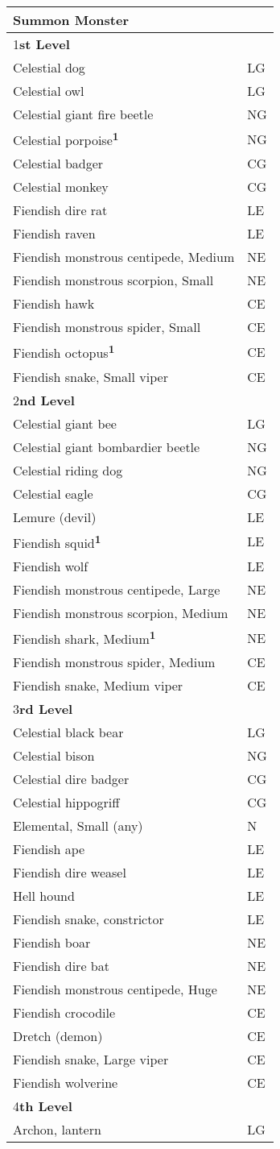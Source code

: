 \documentclass{article}
\begin{document}
\vspace{12pt}
\begin{tabular}{|>{\raggedright}p{227pt}|>{\raggedright}p{21pt}|}
\hline
S\textbf{ummon Monster} & \tabularnewline
\hline
1\textbf{st Level} & \tabularnewline
\hline
Celestial dog & LG\tabularnewline
\hline
Celestial owl & LG\tabularnewline
\hline
Celestial giant fire beetle & NG\tabularnewline
\hline
Celestial porpoise\textsuperscript{\textbf{1}} & NG\tabularnewline
\hline
Celestial badger & CG\tabularnewline
\hline
Celestial monkey & CG\tabularnewline
\hline
Fiendish dire rat & LE\tabularnewline
\hline
Fiendish raven & LE\tabularnewline
\hline
Fiendish monstrous centipede, Medium & NE\tabularnewline
\hline
Fiendish monstrous scorpion, Small & NE\tabularnewline
\hline
Fiendish hawk & CE\tabularnewline
\hline
Fiendish monstrous spider, Small & CE\tabularnewline
\hline
Fiendish octopus\textsuperscript{\textbf{1}} & CE\tabularnewline
\hline
Fiendish snake, Small viper & CE\tabularnewline
\hline
2\textbf{nd Level} & \tabularnewline
\hline
Celestial giant bee & LG\tabularnewline
\hline
Celestial giant bombardier beetle & NG\tabularnewline
\hline
Celestial riding dog & NG\tabularnewline
\hline
Celestial eagle & CG\tabularnewline
\hline
Lemure (devil) & LE\tabularnewline
\hline
Fiendish squid\textsuperscript{\textbf{1}} & LE\tabularnewline
\hline
Fiendish wolf & LE\tabularnewline
\hline
Fiendish monstrous centipede, Large & NE\tabularnewline
\hline
Fiendish monstrous scorpion, Medium & NE\tabularnewline
\hline
Fiendish shark, Medium\textsuperscript{\textbf{1}} & NE\tabularnewline
\hline
Fiendish monstrous spider, Medium & CE\tabularnewline
\hline
Fiendish snake, Medium viper & CE\tabularnewline
\hline
3\textbf{rd Level} & \tabularnewline
\hline
Celestial black bear & LG\tabularnewline
\hline
Celestial bison & NG\tabularnewline
\hline
Celestial dire badger & CG\tabularnewline
\hline
Celestial hippogriff & CG\tabularnewline
\hline
Elemental, Small (any) & N\tabularnewline
\hline
Fiendish ape & LE\tabularnewline
\hline
Fiendish dire weasel & LE\tabularnewline
\hline
Hell hound & LE\tabularnewline
\hline
Fiendish snake, constrictor  & LE\tabularnewline
\hline
Fiendish boar & NE\tabularnewline
\hline
Fiendish dire bat & NE\tabularnewline
\hline
Fiendish monstrous centipede, Huge & NE\tabularnewline
\hline
Fiendish crocodile & CE\tabularnewline
\hline
Dretch (demon) & CE\tabularnewline
\hline
Fiendish snake, Large viper & CE\tabularnewline
\hline
Fiendish wolverine & CE\tabularnewline
\hline
4\textbf{th Level} & \tabularnewline
\hline
Archon, lantern & LG\tabularnewline
\hline

\end{tabular}
\end{document}
